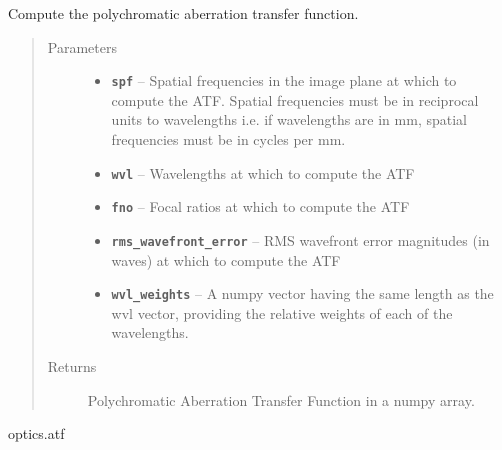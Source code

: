 \documentclass[a4paper,10pt,english]{sphinxmanual}
\begin{document}
\begin{fulllineitems}
\label{packages:optics.patf}
Compute the polychromatic aberration transfer function.
\begin{quote}\begin{description}
\item[{Parameters}] \leavevmode\begin{itemize}
\item {} 
\textbf{\texttt{spf}} -- Spatial frequencies in the image plane at which to compute the ATF. Spatial frequencies must be in
reciprocal units to wavelengths i.e. if wavelengths are in mm, spatial frequencies must be in cycles per mm.

\item {} 
\textbf{\texttt{wvl}} -- Wavelengths at which to compute the ATF

\item {} 
\textbf{\texttt{fno}} -- Focal ratios at which to compute the ATF

\item {} 
\textbf{\texttt{rms\_wavefront\_error}} -- RMS wavefront error magnitudes (in waves) at which to compute the ATF

\item {} 
\textbf{\texttt{wvl\_weights}} -- A numpy vector having the same length as the wvl vector, providing the relative weights of each
of the wavelengths.

\end{itemize}

\item[{Returns}] \leavevmode
Polychromatic Aberration Transfer Function in a numpy array.

\end{description}\end{quote}




optics.atf



\end{fulllineitems}

\end{document}
